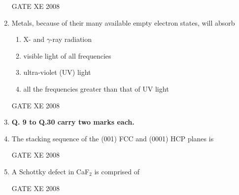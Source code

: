 \documentclass[12pt]{article}
\begin{document}
\begin{enumerate}[label=Q\arabic*.]
    GATE XE 2008  
\item Metals, because of their many available empty electron states, will absorb  

\begin{enumerate}[label=(\Alph*)]
\item  X- and $\gamma$-ray radiation  
\item  visible light of all frequencies  
\item  ultra-violet (UV) light  
\item  all the frequencies greater than that of UV light 
\end{enumerate}    

    GATE XE 2008  

\item[] \textbf{Q. 9 to Q.30 carry two marks each.}
\item The stacking sequence of the (001) FCC and (0001) HCP planes is  

\begin{enumerate}[label=(\Alph*)]
\end{enumerate}

GATE XE 2008

\item A Schottky defect in CaF$_2$ is comprised of  

\begin{enumerate}[label=(\Alph*)]
\end{enumerate}

GATE XE 2008


\end{enumerate}
\end{document}

